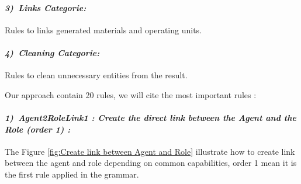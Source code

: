 \paragraph{\emph{3)~Links Categorie:} } 
Rules to links generated materials and operating units.

\paragraph{\emph{4)~Cleaning Categorie:} } 
Rules to clean unnecessary entities from the result.


Our approach contain 20 rules, we will cite the most important  rules  : 


\paragraph{\emph{1)~Agent2RoleLink1 : Create the direct link between the Agent and the Role (order 1) :} } 
The Figure \ref{fig:Create link between Agent and Role} illustrate how to create link between the agent and role
depending on common capabilities, order 1 mean it is the first rule applied in the grammar.

